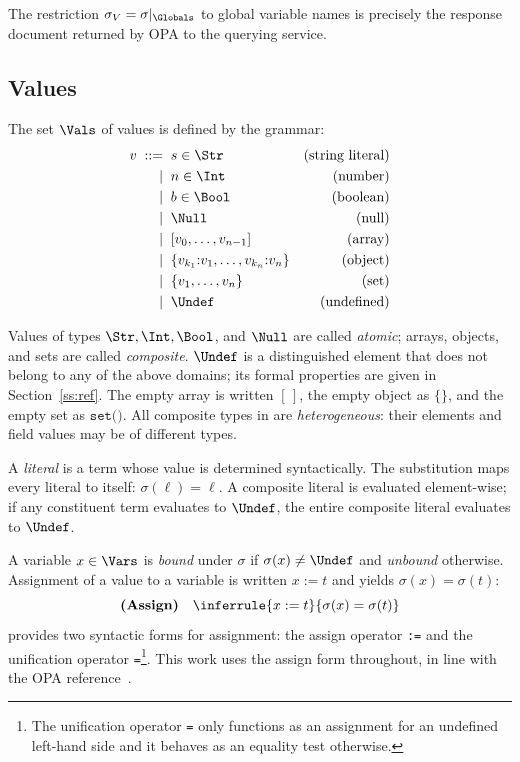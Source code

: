 The restriction $\sigma_V = \sigma|_{\Globals}$ to global variable names is precisely the response document returned by OPA to the querying service.


\subsection{Values}
\label{ss:vals}


The set $\Vals$ of \rego values is defined by the grammar:
\begin{align*}
v \;::=\;\;
  & s \in \Str
    & \text{(string literal)} \\
  \mid\;\; & n \in \Int
    & \text{(number)} \\
  \mid\;\; & b \in \Bool
    & \text{(boolean)} \\
  \mid\;\; & \Null
    & \text{(null)} \\
  \mid\;\; & [v_0, \ldots, v_{n-1}]
    & \text{(array)} \\
  \mid\;\; & \{v_{k_1}{:}v_1, \ldots, v_{k_n}{:}v_n\}
    & \text{(object)} \\
  \mid\;\; & \{v_1, \ldots, v_n\}
    & \text{(set)} \\
  \mid\;\; & \Undef
    & \text{(undefined)}
\end{align*}

Values of types $\Str, \Int, \Bool$, and $\Null$ are called \emph{atomic}; arrays, objects, and sets are called \emph{composite}.
$\Undef$ is a distinguished element that does not belong to any of the above domains; its formal properties are given in Section~\ref{ss:ref}.
The empty array is written $[\,]$, the empty object as $\{\}$, and the empty set as $\texttt{set()}$.
All composite types in \rego are \emph{heterogeneous}: their elements and field values may be of different types.

A \emph{literal} is a term whose value is determined syntactically.
The substitution maps every literal to itself: $\sigma(\ell) = \ell$.
A composite literal is evaluated element-wise; if any constituent term evaluates to $\Undef$, the entire composite literal evaluates to $\Undef$.

A variable $x \in \Vars$ is \emph{bound} under $\sigma$ if $\sigma(x) \neq \Undef$ and \emph{unbound} otherwise.
Assignment of a value to a variable is written $x \mathrel{:=} t$ and yields $\sigma(x) = \sigma(t)$:
\[
\textbf{(Assign)}\quad
\inferrule{
  x \mathrel{:=} t
}{
  \sigma(x) = \sigma(t)
}
\]
\rego provides two syntactic forms for assignment: the assign operator \texttt{:=} and the unification operator \texttt{=}\footnote{
  The unification operator \texttt{=} only functions as an assignment for an undefined left-hand side and it behaves as an equality test otherwise.
}.
This work uses the assign form throughout, in line with the OPA reference~\cite{opa:web:ass}.

